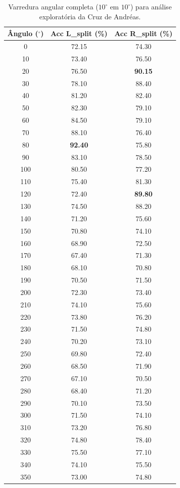 \documentclass[11pt,a4paper]{article}
\begin{document}
\begin{table}[htbp]
\centering
\caption{Varredura angular completa (\(10^\circ\) em \(10^\circ\)) para análise exploratória da Cruz de Andréas.}
\label{tab:cruz-andreas-completa}
\small
\setlength{\tabcolsep}{4pt}
\renewcommand{\arraystretch}{1.08}
\begin{tabular}{ccc}
\toprule
\textbf{Ângulo (\(^\circ\))} & \textbf{Acc L\_split (\%)} & \textbf{Acc R\_split (\%)} \\
\midrule
0   & 72.15 & 74.30 \\
10  & 73.40 & 76.50 \\
20  & 76.50 & \textbf{90.15} \\
30  & 78.10 & 88.40 \\
40  & 81.20 & 82.40 \\
50  & 82.30 & 79.10 \\
60  & 84.50 & 79.10 \\
70  & 88.10 & 76.40 \\
80  & \textbf{92.40} & 75.80 \\
90  & 83.10 & 78.50 \\
100 & 80.50 & 77.20 \\
110 & 75.40 & 81.30 \\
120 & 72.40 & \textbf{89.80} \\
130 & 74.50 & 88.20 \\
140 & 71.20 & 75.60 \\
150 & 70.80 & 74.10 \\
160 & 68.90 & 72.50 \\
170 & 67.40 & 71.30 \\
180 & 68.10 & 70.80 \\
190 & 70.50 & 71.50 \\
200 & 72.30 & 73.40 \\
210 & 74.10 & 75.60 \\
220 & 73.80 & 76.20 \\
230 & 71.50 & 74.80 \\
240 & 70.20 & 73.10 \\
250 & 69.80 & 72.40 \\
260 & 68.50 & 71.90 \\
270 & 67.10 & 70.50 \\
280 & 68.40 & 71.20 \\
290 & 70.10 & 73.50 \\
300 & 71.50 & 74.10 \\
310 & 73.20 & 76.80 \\
320 & 74.80 & 78.40 \\
330 & 75.50 & 77.10 \\
340 & 74.10 & 75.50 \\
350 & 73.00 & 74.80 \\
\bottomrule
\end{tabular}
\end{table}
\end{document}
